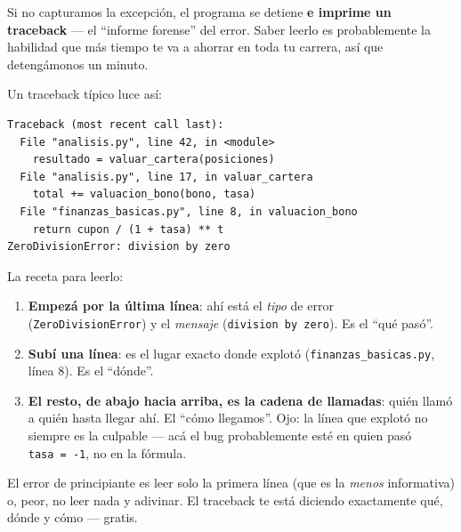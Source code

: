 \documentclass[
  spanish,
  letterpaper,
  DIV=11,
  numbers=noendperiod]{scrreprt}
\providecommand{\tightlist}{%
  \setlength{\itemsep}{0pt}\setlength{\parskip}{0pt}}
\begin{document}
Si no capturamos la excepción, el programa se detiene \textbf{e imprime
un traceback} --- el ``informe forense'' del error. Saber leerlo es
probablemente la habilidad que más tiempo te va a ahorrar en toda tu
carrera, así que detengámonos un minuto.

\begin{tcolorbox}[enhanced jigsaw, bottomrule=.15mm, colback=white, opacitybacktitle=0.6, arc=.35mm, toprule=.15mm, opacityback=0, breakable, titlerule=0mm, left=2mm, coltitle=black, colbacktitle=quarto-callout-tip-color!10!white, colframe=quarto-callout-tip-color-frame, leftrule=.75mm, toptitle=1mm, bottomtitle=1mm, title=\textcolor{quarto-callout-tip-color}{\faLightbulb}\hspace{0.5em}{Cómo leer un traceback (la habilidad subvalorada)}, rightrule=.15mm]

Un traceback típico luce así:

\begin{verbatim}
Traceback (most recent call last):
  File "analisis.py", line 42, in <module>
    resultado = valuar_cartera(posiciones)
  File "analisis.py", line 17, in valuar_cartera
    total += valuacion_bono(bono, tasa)
  File "finanzas_basicas.py", line 8, in valuacion_bono
    return cupon / (1 + tasa) ** t
ZeroDivisionError: division by zero
\end{verbatim}

La receta para leerlo:

\begin{enumerate}
\def\labelenumi{\arabic{enumi}.}
\tightlist
\item
  \textbf{Empezá por la última línea}: ahí está el \emph{tipo} de error
  (\texttt{ZeroDivisionError}) y el \emph{mensaje}
  (\texttt{division\ by\ zero}). Es el ``qué pasó''.
\item
  \textbf{Subí una línea}: es el lugar exacto donde explotó
  (\texttt{finanzas\_basicas.py}, línea 8). Es el ``dónde''.
\item
  \textbf{El resto, de abajo hacia arriba, es la cadena de llamadas}:
  quién llamó a quién hasta llegar ahí. El ``cómo llegamos''. Ojo: la
  línea que explotó no siempre es la culpable --- acá el bug
  probablemente esté en quien pasó \texttt{tasa\ =\ -1}, no en la
  fórmula.
\end{enumerate}

El error de principiante es leer solo la primera línea (que es la
\emph{menos} informativa) o, peor, no leer nada y adivinar. El traceback
te está diciendo exactamente qué, dónde y cómo --- gratis.

\end{tcolorbox}
\end{document}
